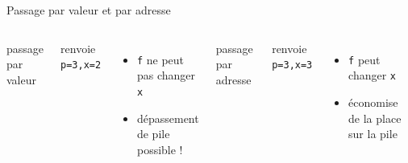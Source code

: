 \documentclass[11pt,mathserif]{beamer}
\newcommand{\scout}{\faAngellist}
\newcommand{\argi}{\faLightbulbO}
\newcommand{\kontuz}{\faExclamationTriangle}
\newcommand{\triste}{\faFrownO}
\newcommand{\mylang}{c}
\newcommand{\extlang}{c}
\newcommand{\mylang}{fortran}
\newcommand{\extlang}{f90}
\newcommand{\includeSrc}[1]{}
\begin{document}
\begin{frame}{Passage par valeur et par adresse}
\begin{columns}[t]
\pause
\column{5cm}
 passage par valeur
  \includeSrc{code/valeur}
  renvoie \lstinline! p=3,x=2!
  \begin{itemize}
    \item[\triste] {\tt f} ne peut pas changer {\tt x}
    \item[\kontuz] dépassement de pile possible !
   \end{itemize} 
\pause
\column{5cm}
 passage par adresse
  \includeSrc{code/adresse}
  renvoie \lstinline! p=3,x=3!
  \begin{itemize}
    \item[\scout] {\tt f} peut changer {\tt x}
    \item[\argi] économise de la place sur la pile
   \end{itemize} 
\end{columns}
\end{frame}
\fi %
\end{document}
